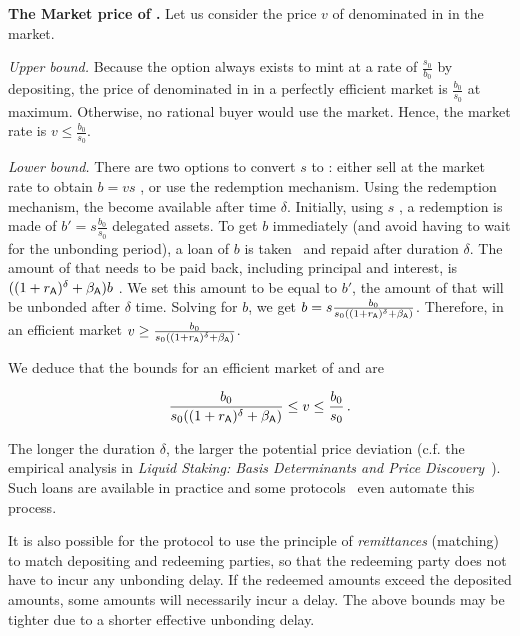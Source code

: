 \noindent
\textbf{The Market price of \stasset.}\label{sec:stasset-price}
Let us consider the price $v$ of \stasset denominated in \asset in the market.

\emph{Upper bound.}
Because the option always exists to mint at a rate of $\frac{s_0}{b_0}$ by
depositing, the price of \stasset denominated in \asset in a perfectly
efficient market is $\frac{b_0}{s_0}$ at maximum. Otherwise, no
rational buyer would use the market. Hence, the market rate is
$v \leq \frac{b_0}{s_0}$.

\emph{Lower bound.}
There are two options to convert $s$ \stasset to \asset: either sell
at the market rate to obtain $b = v s$ \asset, or use the redemption mechanism.
Using the redemption mechanism, the \assets become available after
time $\delta$.
Initially, using $s$ \stasset, a redemption is made of $b' = s \frac{b_0}{s_0}$
delegated assets. To get $b$ \asset immediately (and avoid having to wait
for the unbonding period), a loan of $b$ \asset is taken~\cite[p.~13]{liquid-staking-report} and
repaid after duration $\delta$.
The amount of \asset that needs to be paid back,
including principal and interest, is $((1 + r_{\textsf{A}})^\delta + \beta_{\textsf{A}})b$ \asset.
We set this amount to be equal to $b'$, the amount of \assets that will be
unbonded after $\delta$ time. Solving for $b$, we get
$b = s \frac{b_0}{s_0 ((1 + r_{\textsf{A}})^\delta + \beta_{\textsf{A}})}$.
Therefore, in an efficient market $v \geq \frac{b_0}{s_0 ((1 + r_{\textsf{A}})^\delta + \beta_{\textsf{A}})}$.

We deduce that the bounds for an efficient market of \asset and \stasset are

\[
  \frac{b_0}{s_0 ((1 + r_{\textsf{A}})^\delta + \beta_{\textsf{A}})} \leq v \leq \frac{b_0}{s_0}\,.
\]

The longer the duration $\delta$, the larger the potential price deviation
(c.f. the empirical analysis in
\emph{Liquid Staking: Basis Determinants and Price Discovery}~\cite{scharnowski2022liquid}).
Such loans are available in practice and some
protocols~\cite[\S5]{parallel}\cite{marinade-matching} even automate this process.

It is also possible for the protocol to use the principle of \emph{remittances}
(matching)~\cite[\S5]{parallel}\cite{marinade-matching} to match depositing and
redeeming parties, so that the redeeming party does not have to incur any unbonding delay.
If the redeemed amounts exceed the deposited amounts, some amounts will necessarily incur
a delay. The above bounds may be tighter due to
a shorter effective unbonding delay.
